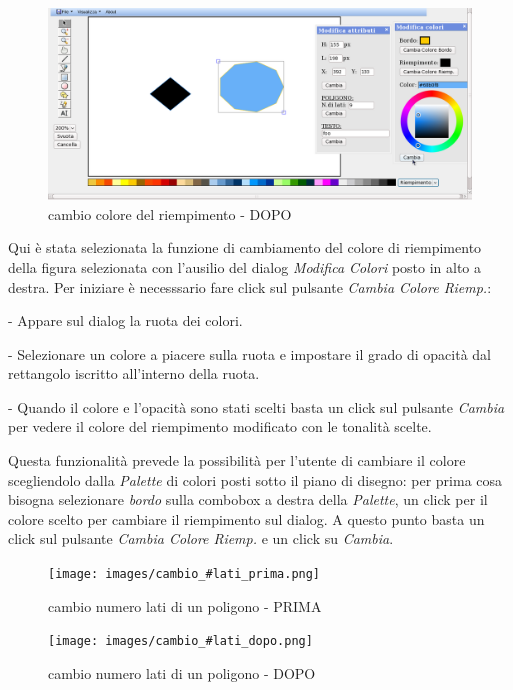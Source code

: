 \begin{figure}[!ht]
\centering
\includegraphics[scale=4]{images/colore_riempimento_dopo.png}
\caption{cambio colore del riempimento  - DOPO}
\end{figure} 


\vspace{100pt}
Qui \`e stata selezionata la funzione di cambiamento del colore di riempimento della figura selezionata con l'ausilio del dialog \textit{Modifica Colori} posto in alto a destra. Per iniziare \`e necesssario fare click sul pulsante \textit{Cambia Colore Riemp.}: 
\begin{elencopuntato}[\normindent]
\item[-] Appare sul dialog la ruota dei colori.
\item[-] Selezionare un colore a piacere sulla ruota e impostare il grado di opacit\`a dal rettangolo iscritto all'interno della ruota. 
\item[-]Quando il colore e l'opacit\`a sono stati scelti basta un click sul pulsante \textit{Cambia} per vedere il colore del riempimento modificato con le tonalit\`a scelte. 
\end{elencopuntato}
Questa funzionalit\`a prevede la possibilit\`a per l'utente di cambiare il colore scegliendolo dalla \textit{Palette} di colori posti sotto il piano di disegno: per prima cosa bisogna selezionare \textit{bordo} sulla combobox a destra della \textit{Palette}, un click per il colore scelto per cambiare il riempimento sul dialog. A questo punto basta un click sul pulsante \textit{Cambia Colore Riemp.} e un click su \textit{Cambia}.


\begin{figure}[!ht]
\centering
\texttt{[image: images/cambio\_\#lati\_prima.png]}
\caption{cambio numero lati di un poligono  - PRIMA}
\end{figure} 

\begin{figure}[!ht]
\centering
\texttt{[image: images/cambio\_\#lati\_dopo.png]}
\caption{cambio numero lati di un poligono  - DOPO}
\end{figure} 

